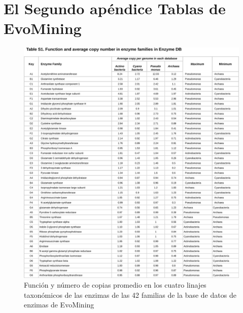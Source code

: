\documentclass[12pt,twoside]{reedthesis}
\begin{document}
  \chapter{El Segundo apéndice Tablas de
  EvoMining}\label{el-segundo-apendice-tablas-de-evomining}
  
  \begin{figure}[h!tbp]
  \centering
  \includegraphics[angle = 0,scale = .8]{Anexos/Tabla42.pdf}
  \caption[Expansiones de las 42 enzimas en los cuatro linajes genómicos]{\footnotesize{Función y número de copias promedio en los cuatro linajes taxonómicos de las enzimas de las 42 familias de la base de datos de enzimas de EvoMining}}
  \label{fig:DataTabla42}
  \end{figure}
  
\end{document}
